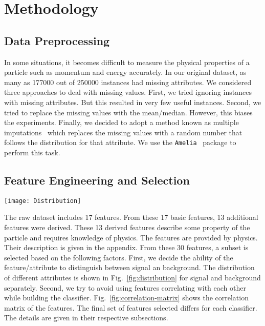 \section{Methodology}
\label{sec:methodology}


\subsection{Data Preprocessing}
In some situations, it becomes difficult to measure the physical properties of a particle such as momentum and energy accurately. In our original dataset, as many as 177000 out of 250000 instances had missing attributes. We considered three approaches to deal with missing values. First, we tried ignoring instances with missing attributes. But this resulted in very few useful instances. Second, we tried to replace the missing values with the mean/median. However, this biases the experiments. Finally, we decided to adopt a method known as multiple imputations~\cite{Multiple-Imputation} which replaces the missing values with a random number that follows the distribution for that attribute. We use the \texttt{Amelia}~\cite{Amelia} package to perform this task.



\subsection{Feature Engineering and Selection}

\begin{figure*}[h]
\centering
\texttt{[image: Distribution]}
\caption{Distribution of different attributes for signal. Blue represents signal and red represents background.}
\label{fig:distribution}
\end{figure*}

The raw dataset includes 17 features. From these 17 basic features, 13 additional features were derived. These 13 derived features describe some property of the particle and requires knowledge of physics. The features are provided by physics. Their description is given in the appendix. From these 30 features, a subset is selected based on the following factors. First, we decide the ability of the feature/attribute to distinguish between signal an background. The distribution of different attributes is shown in Fig.~\ref{fig:distribution} for signal and background separately. Second, we try to avoid using features correlating with each other while building the classifier. Fig.~\ref{fig:correlation-matrix} shows the correlation matrix of the features. The final set of features selected differs for each classifier. The details are given in their respective subsections.

